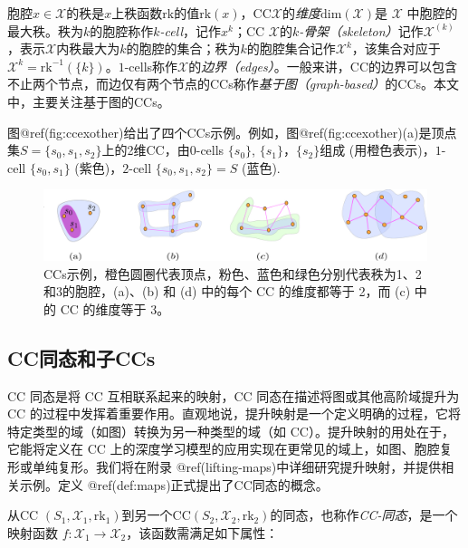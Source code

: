 \documentclass[
  12pt,
]{krantz}
\begin{document}
胞腔\(x\in\mathcal{X}\)的秩是\(x\)上秩函数\(\mbox{rk}\)的值\(\mbox{rk}(x)\)，CC\(\mathcal{X}\)的\emph{维度}\(\mbox{dim}(\mathcal{X})\)是
\(\mathcal{X}\)
中胞腔的最大秩。秩为\(k\)的胞腔称作\emph{\(k\)-cell}，记作\(x^k\)；CC
\(\mathcal{X}\)的\emph{\(k\)-骨架（skeleton）}记作\(\mathcal{X}^{(k)}\)，表示\(\mathcal{X}\)内秩最大为\(k\)的胞腔的集合；秩为\(k\)的胞腔集合记作\(\mathcal{X}^k\)，该集合对应于\(\mathcal{X}^k=\mbox{rk}^{-1}(\{k\})\)。\(1\)-cells称作\(\mathcal{X}\)的\emph{边界（edges）}。一般来讲，CC的边界可以包含不止两个节点，而边仅有两个节点的CCs称作\emph{基于图（graph-based）}的CCs。本文中，主要关注基于图的CCs。

\label{unnamed-chunk-3}
图@ref(fig:ccexother)给出了四个CCs示例。例如，图@ref(fig:ccexother)(a)是顶点集\(S=\{s_0,s_1,s_2\}\)上的2维CC，由\(0\)-cells
\(\{s_0\}\), \(\{s_1\}\)，\(\{s_2\}\)组成 (用橙色表示)，\(1\)-cell
\(\{s_0, s_1\}\) (紫色)，\(2\)-cell \(\{s_0, s_1, s_2\} = S\) (蓝色).

\begin{figure}

{\centering \includegraphics{figures/cc_examples} 

}

\caption{CCs示例，橙色圆圈代表顶点，粉色、蓝色和绿色分别代表秩为1、2和3的胞腔，(a)、(b) 和 (d) 中的每个 CC 的维度都等于 2，而 (c) 中的 CC 的维度等于 3。}\label{fig:ccexother}
\end{figure}

\subsection{CC同态和子CCs}\label{cc-homomorphisms-and-sub-ccs}

CC 同态是将 CC 互相联系起来的映射，CC 同态在描述将图或其他高阶域提升为
CC
的过程中发挥着重要作用。直观地说，提升映射是一个定义明确的过程，它将特定类型的域（如图）转换为另一种类型的域（如
CC）。提升映射的用处在于，它能将定义在 CC
上的深度学习模型的应用实现在更常见的域上，如图、胞腔复形或单纯复形。我们将在附录
@ref(lifting-maps)中详细研究提升映射，并提供相关示例。定义
@ref(def:maps)正式提出了CC同态的概念。

\label{maps}
从CC
\((S_1, \mathcal{X}_1, \mbox{rk}_1)\)到另一个CC\((S_2, \mathcal{X}_2, \mbox{rk}_2)\)的同态，也称作\emph{CC-同态}，是一个映射函数
\(f \colon \mathcal{X}_1 \to \mathcal{X}_2\)，该函数需满足如下属性：
\end{document}
